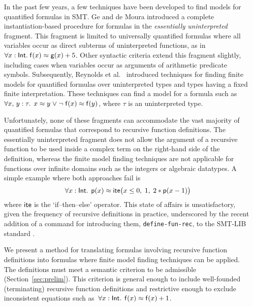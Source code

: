 In the past few years, a few techniques have been developed to find models for
quantified formulas in SMT.
Ge and de Moura \cite{GeDeM-CAV-09} introduced a complete instantiation-based
procedure for formulas in the \emph{essentially uninterpreted} fragment.
This fragment is limited to universally quantified formulas where all
variables occur as direct subterms of uninterpreted
functions, as in $\forall x : \mathsf{Int}.\; \mathsf{f}( x ) \approx \mathsf{g}( x ) + 5$.
Other syntactic criteria extend
this fragment slightly, including cases when variables occur as arguments of
arithmetic predicate symbols. Subsequently, Reynolds et al.\
\cite{ReyEtAl-1-RR-13,reynolds-et-al-2013} introduced techniques for finding finite
models for quantified
formulas over uninterpreted types and types having a fixed finite
interpretation. %
These techniques can
find a model for a formula such as $\forall x,\, y : \tau.\;\, x \teq
y \vee \allowbreak \neg \con{f}( x ) \teq \con{f}( y )$, where $\tau$ is an uninterpreted type.

Unfortunately, none of these fragments can accommodate the vast majority of
quantified formulas that correspond to recursive function definitions. The
essentially uninterpreted fragment does not allow the argument of a
recursive function to be used inside a complex term on the right-hand side
of the definition,
whereas the finite model finding techniques %
are not applicable for functions over infinite domains such as the integers or
algebraic datatypes. A simple example where both approaches fail is
$$\forall x : {\mathsf{Int}}.\;\,
\mathsf{p}( x ) \approx \mathsf{ite}\bigl( x \leq 0,\allowbreak\;  1,\allowbreak\;
  2 * \mathsf{p}( x - 1 ) \bigr)$$ %
where $\mathsf{ite}$ is the `if--then--else' operator.
This state of affairs is unsatisfactory, given the frequency of
recursive definitions in practice, underscored by the recent
addition of a %
command for introducing them, \texttt{define-fun-rec},
to the SMT-LIB standard \cite{smtlib25}.

We present a method for translating formulas involving recursive function
definitions into formulas where finite model finding techniques can be applied.
The definitions must meet a semantic criterion to be admissible 
(Section~\ref{sec:prelim}). 
This criterion is general enough to include well-founded (terminating)
recursive function definitions and restrictive enough to exclude inconsistent
equations such as \,$\forall x : {\mathsf{Int}}.\;\, \mathsf{f}(x) \approx \mathsf{f}(x) +
1$.

